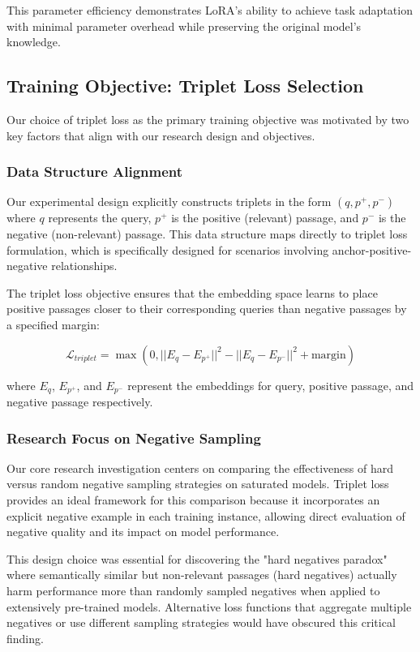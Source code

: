 This parameter efficiency demonstrates LoRA's ability to achieve task adaptation with minimal parameter overhead while preserving the original model's knowledge.

\subsection{Training Objective: Triplet Loss Selection}

Our choice of triplet loss as the primary training objective was motivated by two key factors that align with our research design and objectives.

\subsubsection{Data Structure Alignment}

Our experimental design explicitly constructs triplets in the form $(q, p^+, p^-)$ where $q$ represents the query, $p^+$ is the positive (relevant) passage, and $p^-$ is the negative (non-relevant) passage. This data structure maps directly to triplet loss formulation, which is specifically designed for scenarios involving anchor-positive-negative relationships. 

The triplet loss objective ensures that the embedding space learns to place positive passages closer to their corresponding queries than negative passages by a specified margin:

\begin{equation}
\mathcal{L}_{triplet} = \max(0, ||E_q - E_{p^+}||^2 - ||E_q - E_{p^-}||^2 + \text{margin})
\end{equation}

where $E_q$, $E_{p^+}$, and $E_{p^-}$ represent the embeddings for query, positive passage, and negative passage respectively.

\subsubsection{Research Focus on Negative Sampling}

Our core research investigation centers on comparing the effectiveness of hard versus random negative sampling strategies on saturated models. Triplet loss provides an ideal framework for this comparison because it incorporates an explicit negative example in each training instance, allowing direct evaluation of negative quality and its impact on model performance.

This design choice was essential for discovering the "hard negatives paradox" where semantically similar but non-relevant passages (hard negatives) actually harm performance more than randomly sampled negatives when applied to extensively pre-trained models. Alternative loss functions that aggregate multiple negatives or use different sampling strategies would have obscured this critical finding.

